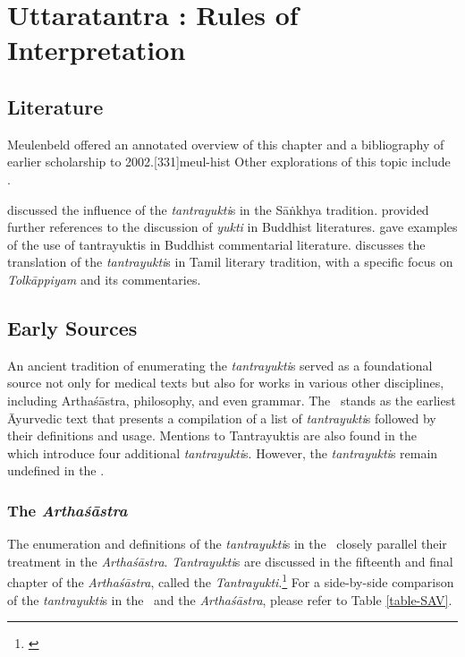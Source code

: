 
\chapter[Uttaratantra 65:  Rules of Interpretation]{Uttaratantra :  
Rules of Interpretation}

\section{Literature} 

Meulenbeld offered an annotated overview of this chapter and a bibliography
of earlier scholarship to 2002.[331]{meul-hist}  Other explorations 
of this topic include \cite{dasg-1952,
lele-1981,
mejo-2000,
nara-1949,
ober-1968,
scha-1993,
sing-2003,
muth-1976}. 


\cite{frau-1958} discussed the influence of the \emph{tantrayukti}s in the Sāṅkhya tradition.
\citet[105--106, fn.\,109]{prei-2013} provided further references to the
discussion of \emph{yukti} in Buddhist literatures. \citet{mane-2008}
gave examples of the use of tantrayuktis in Buddhist commentarial
literature. \citet{chev-2009} discusses the translation of the \emph{tantrayukti}s in Tamil literary tradition, with a specific focus on \emph{Tolkāppiyam} and its commentaries.


\section{Early Sources}

An ancient tradition of enumerating the \emph{tantrayukti}s served as a 
foundational source not only for medical texts but also for works in various other 
disciplines, including Arthaśāstra, philosophy, and even grammar. The \SS\  stands 
as the earliest Āyurvedic text that presents a compilation of a list of 
\emph{tantrayukti}s followed by their definitions and usage. Mentions to 
Tantrayuktis are also found in the \CS\   which introduce four additional 
\emph{tantrayukti}s. However, the \emph{tantrayukti}s remain undefined in the 
\CS. 

\subsection{The \emph{Arthaśāstra}} 
The enumeration and definitions of the \emph{tantrayukti}s in the 
\SS\  closely parallel their treatment in the \emph{Arthaśāstra}. 
\emph{Tantrayukti}s are discussed in the fifteenth and final chapter of the 
\emph{Arthaśāstra}, called the 
\emph{Tantrayukti}.\footnote{\cite[280--283]{kang-1960}} For a side-by-side 
comparison of the \emph{tantrayukti}s in the \SS\ and the \emph{Arthaśāstra}, 
please refer to Table \ref{table-SAV}.

